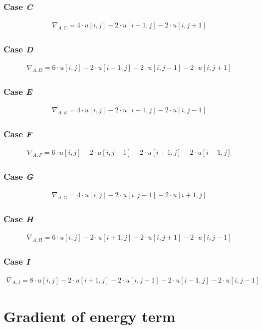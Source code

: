 \documentclass[a4paper]{scrreprt}
\begin{document}
\subsubsection{Case \emph{C}}

\begin{align*}
		\nabla_{A, C} =
		  4 \cdot u[i, j] - 2 \cdot u[i - 1, j] - 2 \cdot u[i, j + 1]
\end{align*}

\subsubsection{Case \emph{D}}

\begin{align*}
		\nabla_{A, D} = 
		  6 \cdot u[i, j] - 2 \cdot u[i - 1, j] - 2 \cdot u[i, j - 1] - 2 \cdot u[i, j + 1]
\end{align*}

\subsubsection{Case \emph{E}}

\begin{align*}
		\nabla_{A, E} =
		  4 \cdot u[i, j] - 2 \cdot u[i - 1, j] - 2 \cdot u[i, j - 1]
\end{align*}

\subsubsection{Case \emph{F}}

\begin{align*}
		\nabla_{A, F} =
		  6 \cdot u[i, j] - 2 \cdot u[i, j - 1] - 2 \cdot u[i + 1, j] - 2 \cdot u[i - 1, j]
\end{align*}

\subsubsection{Case \emph{G}}

\begin{align*}
		\nabla_{A, G} = 
		  4 \cdot u[i, j] - 2 \cdot u[i, j - 1] - 2 \cdot u[i + 1, j]
\end{align*}

\subsubsection{Case \emph{H}}

\begin{align*}
		\nabla_{A, H} =
		  6 \cdot u[i, j] - 2 \cdot u[i + 1, j] - 2 \cdot u[i, j + 1] - 2 \cdot u[i, j - 1]
\end{align*}

\subsubsection{Case \emph{I}}

\begin{align*}
		\nabla_{A, I} =
		  8 \cdot u[i, j] - 2 \cdot u[i + 1, j] - 2 \cdot u[i, j + 1] - 2 \cdot u[i - 1, j] - 2 \cdot u[i, j - 1]
\end{align*}


\section{Gradient of energy term}

\printbibliography
\end{document}

